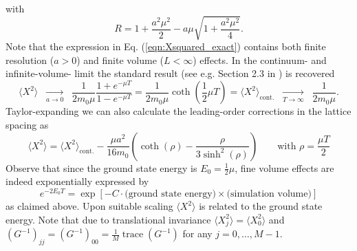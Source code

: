 \documentclass[11pt]{article}
\begin{document}
with
\begin{equation}
R = 1+\frac{a^2\mu^2}{2}-a\mu\sqrt{1+\frac{a^2\mu^2}{4}}.
\end{equation}
Note that the expression in Eq. (\ref{eqn:Xsquared_exact}) contains both finite resolution ($a>0$) and finite volume ($L<\infty$) effects. In the continuum- and infinite-volume- limit the standard result (see e.g. Section 2.3 in \cite{Sakurai1994}) is recovered
\begin{equation}
\langle X^2\rangle\;\; \underset{a\rightarrow 0}{\longrightarrow}\;\;
\frac{1}{2m_0\mu}\frac{1+e^{-\mu T}}{1-e^{-\mu T}}
=\frac{1}{2m_0\mu}\coth\left(\frac{1}{2}\mu T\right)=\langle X^2\rangle_{\text{cont.}}
\;\; \underset{T\rightarrow \infty}{\longrightarrow}\;\;\frac{1}{2m_0 \mu}.\label{eqn:Xsquared_continuum}
\end{equation}
Taylor-expanding we can also calculate the leading-order corrections in the lattice spacing as
\begin{equation}
  \langle X^2\rangle = \langle X^2\rangle_{\text{cont.}} - \frac{\mu a^2}{16 m_0}\left(\coth\left(\rho\right)-\frac{\rho}{3\sinh^2\left(\rho\right)}\right)
  \qquad\text{with $\rho=\frac{\mu T}{2}$} \label{eqn:finitea_corrections}
\end{equation}
Observe that since the ground state energy is $E_0=\frac{1}{2}\mu$, fine volume effects are indeed exponentially expressed by
\begin{equation}
e^{-2E_0T} = \exp\left[-C\cdot \text{(ground state energy)}\times\text{(simulation volume)}\right]
\end{equation}
as claimed above. Upon suitable scaling $\langle X^2\rangle$ is related to the ground state energy. Note that due to translational invariance $\langle X_j^2\rangle =\langle X_0^2\rangle$ and $\left(G^{-1}\right)_{jj}=\left(G^{-1}\right)_{00}=\frac{1}{M}\operatorname{trace}\left(G^{-1}\right)$ for any $j=0,\dots,M-1$.
\end{document}
